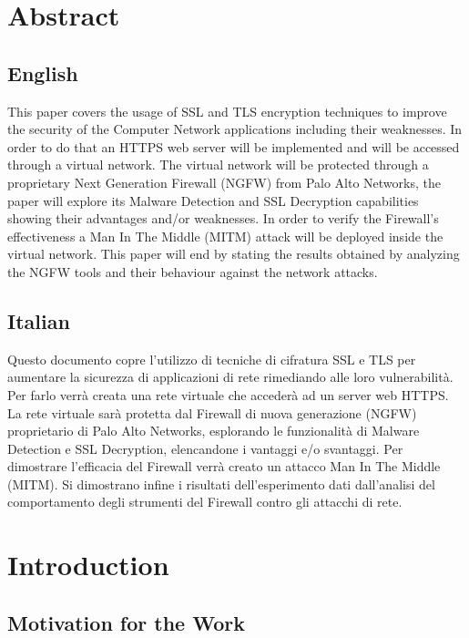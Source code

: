 \documentclass[status=normal,cover=tesi,language=en]{gmeepd}
\begin{document}
\Cover    %

\tableofcontents

\printglossaries


\chapter{Abstract}
\section{English}

This paper covers the usage of SSL and TLS encryption techniques to improve the security of the Computer Network applications including their weaknesses. In order to do that an HTTPS web server will be implemented and will be accessed through a virtual network.
The virtual network will be protected through a proprietary Next Generation Firewall (NGFW) from Palo Alto Networks, the paper will explore its Malware Detection and SSL Decryption capabilities showing their advantages and/or weaknesses.
In order to verify the Firewall's effectiveness a Man In The Middle (MITM) attack will be deployed inside the virtual network.
This paper will end by stating the results obtained by analyzing the NGFW tools and their behaviour against the network attacks.

\section{Italian}

Questo documento copre l'utilizzo di tecniche di cifratura SSL e TLS per aumentare la sicurezza di applicazioni di rete rimediando alle loro vulnerabilit\`a.
Per farlo verr\`a creata una rete virtuale che acceder\`a ad un server web HTTPS.
La rete virtuale sar\`a protetta dal Firewall di nuova generazione (NGFW) proprietario di Palo Alto Networks, esplorando le funzionalit\`a di Malware Detection e SSL Decryption, elencandone i vantaggi e/o svantaggi.
Per dimostrare l'efficacia del Firewall verr\`a creato un attacco Man In The Middle (MITM).
Si dimostrano infine i risultati dell'esperimento dati dall'analisi del comportamento degli strumenti del Firewall contro gli attacchi di rete.


\chapter{Introduction}
\section{Motivation for the Work}
\end{document}
